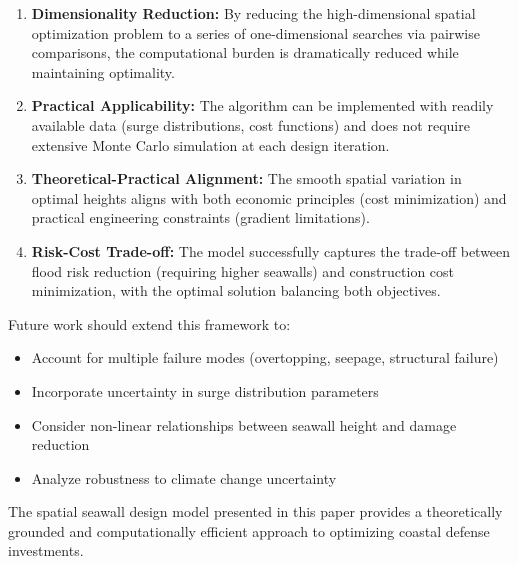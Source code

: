 \documentclass{article}
\begin{document}
\begin{enumerate}
\item \textbf{Dimensionality Reduction:} By reducing the high-dimensional spatial optimization problem to a series of one-dimensional searches via pairwise comparisons, the computational burden is dramatically reduced while maintaining optimality.

\item \textbf{Practical Applicability:} The algorithm can be implemented with readily available data (surge distributions, cost functions) and does not require extensive Monte Carlo simulation at each design iteration.

\item \textbf{Theoretical-Practical Alignment:} The smooth spatial variation in optimal heights aligns with both economic principles (cost minimization) and practical engineering constraints (gradient limitations).

\item \textbf{Risk-Cost Trade-off:} The model successfully captures the trade-off between flood risk reduction (requiring higher seawalls) and construction cost minimization, with the optimal solution balancing both objectives.

\end{enumerate}

Future work should extend this framework to:
\begin{itemize}
\item Account for multiple failure modes (overtopping, seepage, structural failure)
\item Incorporate uncertainty in surge distribution parameters
\item Consider non-linear relationships between seawall height and damage reduction
\item Analyze robustness to climate change uncertainty
\end{itemize}

The spatial seawall design model presented in this paper provides a theoretically grounded and computationally efficient approach to optimizing coastal defense investments.
\end{document}
